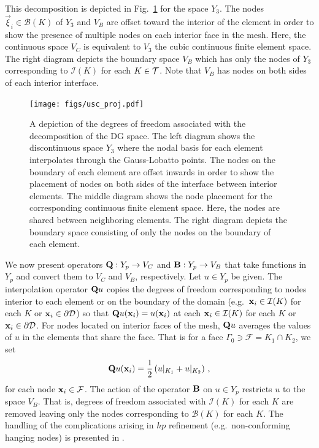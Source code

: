 \documentclass[../doc.tex]{subfiles}
\begin{document}
This decomposition is depicted in Fig.~\ref{dgvef:usc_fes} for the space $Y_3$. The nodes $\vec{\xi}_i \in \mathcal{B}(K)$ of $Y_3$ and $V_B$ are offset toward the interior of the element in order to show the presence of multiple nodes on each interior face in the mesh. Here, the continuous space $V_C$ is equivalent to $V_3$ the cubic continuous finite element space. The right diagram depicts the boundary space $V_B$ which has only the nodes of $Y_3$ corresponding to $\mathcal{I}(K)$ for each $K \in \mathcal{T}$. Note that $V_B$ has nodes on both sides of each interior interface. 
\begin{figure}
\centering
\texttt{[image: figs/usc\_proj.pdf]}
\caption{A depiction of the degrees of freedom associated with the decomposition of the DG space. The left diagram shows the discontinuous space $Y_3$ where the nodal basis for each element interpolates through the Gauss-Lobatto points. The nodes on the boundary of each element are offset inwards in order to show the placement of nodes on both sides of the interface between interior elements. The middle diagram shows the node placement for the corresponding continuous finite element space. Here, the nodes are shared between neighboring elements. The right diagram depicts the boundary space consisting of only the nodes on the boundary of each element. }
\label{dgvef:usc_fes}
\end{figure}

We now present operators $\boldsymbol{\mathrm{Q}} : Y_p \rightarrow V_C$ and $\boldsymbol{\mathrm{B}} : Y_p \rightarrow V_B$ that take functions in $Y_p$ and convert them to $V_C$ and $V_B$, respectively. Let $u \in Y_p$ be given. The interpolation operator $\boldsymbol{\mathrm{Q}}u$ copies the degrees of freedom corresponding to nodes interior to each element or on the boundary of the domain (e.g.~$\boldsymbol{\mathrm{x}}_i \in \mathcal{I}(K)$ for each $K$ or $\boldsymbol{\mathrm{x}}_i \in \partial\mathcal{D}$) so that $\boldsymbol{\mathrm{Q}}u(\boldsymbol{\mathrm{x}}_i) = u(\boldsymbol{\mathrm{x}}_i)$ at each $\boldsymbol{\mathrm{x}}_i \in \mathcal{I}(K)$ for each $K$ or $\boldsymbol{\mathrm{x}}_i \in \partial\mathcal{D}$. For nodes located on interior faces of the mesh, $\boldsymbol{\mathrm{Q}}u$ averages the values of $u$ in the elements that share the face. That is for a face $\Gamma_0 \ni \mathcal{F} = K_1 \cap K_2$, we set 
	\begin{equation}
		\boldsymbol{\mathrm{Q}}u(\boldsymbol{\mathrm{x}}_i) = \frac{1}{2}\left( u|_{K_1} + u|_{K_2} \right) \,,
	\end{equation}
for each node $\boldsymbol{\mathrm{x}}_i \in \mathcal{F}$. 
The action of the operator $\boldsymbol{\mathrm{B}}$ on $u\in Y_p$ restricts $u$ to the space $V_B$. That is, degrees of freedom associated with $\mathcal{I}(K)$ for each $K$ are removed leaving only the nodes corresponding to $\mathcal{B}(K)$ for each $K$. The handling of the complications arising in $hp$ refinement (e.g.~non-conforming hanging nodes) is presented in \cite{Pazner2021}. 
\end{document}
